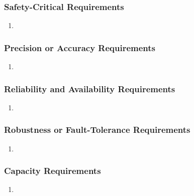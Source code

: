 \documentclass[]{article}
\begin{document}
\subsubsection{Safety-Critical Requirements}
\label{ssub:safety_critical_requirements}
\begin{enumerate}[label={PR-SC\arabic*.}]
    \item 
\end{enumerate}

\subsubsection{Precision or Accuracy Requirements}
\label{ssub:precision_or_accuracy_requirements}
\begin{enumerate}[label={PR-PA\arabic*.}]
    \item 
\end{enumerate}

\subsubsection{Reliability and Availability Requirements}
\label{ssub:reliability_and_availability_requirements}
\begin{enumerate}[label={PR-RA\arabic*.}]
    \item 
\end{enumerate}

\subsubsection{Robustness or Fault-Tolerance Requirements}
\label{ssub:robustness_or_fault_tolerance_requirements}
\begin{enumerate}[label={PR-RFT\arabic*.}]
    \item 
\end{enumerate}

\subsubsection{Capacity Requirements}
\label{ssub:capacity_requirements}
\begin{enumerate}[label={PR-C\arabic*.}]
    \item 
\end{enumerate}
\end{document}
